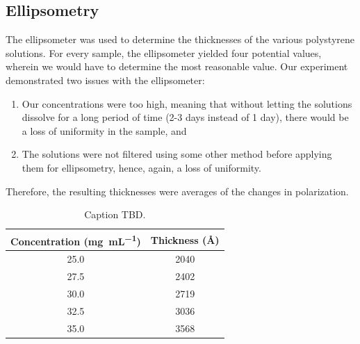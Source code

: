 \documentclass[twocolumn]{article}
\begin{document}
            \subsection{Ellipsometry}
                The ellipsometer was used to determine the thicknesses of the various polystyrene solutions. For every sample, the ellipsometer yielded four potential values, wherein we would have to determine the most reasonable value. Our experiment demonstrated two issues with the ellipsometer:
                \begin{enumerate}
                    \item Our concentrations were too high, meaning that without letting the solutions dissolve for a long period of time (2-3 days instead of 1 day), there would be a loss of uniformity in the sample, and
                    \item The solutions were not filtered using some other method before applying them for ellipsometry, hence, again, a loss of uniformity.
                \end{enumerate}
                
                Therefore, the resulting thicknesses were averages of the changes in polarization.

                \begin{table}
                    \centering
                        \begin{tabular}{@{}cc@{}}
                            \toprule
                            Concentration (\unit{\milli\gram\per\milli\liter}) & Thickness (\unit{\angstrom}) \\ \midrule
                            25.0                  & 2040          \\
                            27.5                  & 2402          \\
                            30.0                  & 2719          \\
                            32.5                  & 3036          \\
                            35.0                  & 3568          \\ \bottomrule
                        \end{tabular}
                        \caption{Caption TBD.}\label{tab:ellips}
                \end{table}
\end{document}
